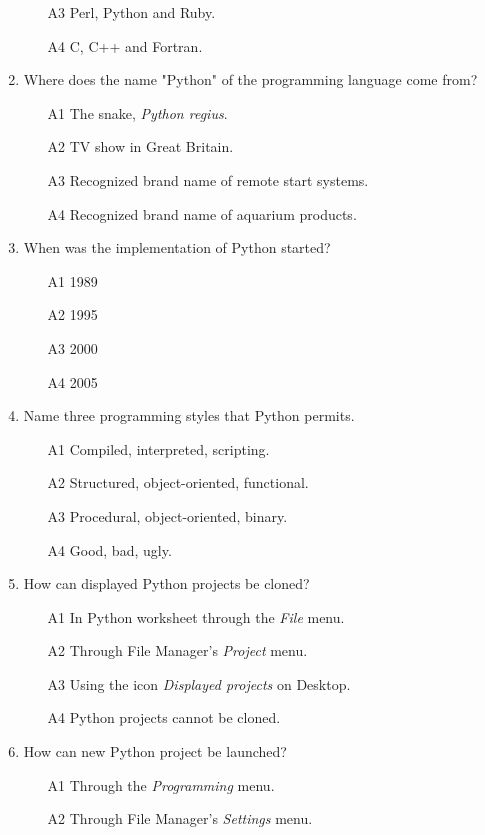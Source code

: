 \begin{enumerate}
\begin{enumerate}
\item[A3] Perl, Python and Ruby. 
\item[A4] C, C++ and Fortran.
\end{enumerate}
\item Where does the name "Python" of the programming language come from?
\begin{enumerate}
\item[A1] The snake, {\em Python regius}.
\item[A2] TV show in Great Britain.
\item[A3] Recognized brand name of remote start systems.
\item[A4] Recognized brand name of aquarium products.
\end{enumerate}
\item When was the implementation of Python started?
\begin{enumerate}
\item[A1] 1989
\item[A2] 1995
\item[A3] 2000
\item[A4] 2005
\end{enumerate}
\item Name three programming styles that Python permits.
\begin{enumerate}
\item[A1] Compiled, interpreted, scripting.
\item[A2] Structured, object-oriented, functional.
\item[A3] Procedural, object-oriented, binary.
\item[A4] Good, bad, ugly.
\end{enumerate}
\item How can displayed Python projects be cloned?
\begin{enumerate}
\item[A1] In Python worksheet through the {\em File} menu.
\item[A2] Through File Manager's {\em Project} menu.
\item[A3] Using the icon {\em Displayed projects} on Desktop.
\item[A4] Python projects cannot be cloned.
\end{enumerate}
\item How can new Python project be launched?
\begin{enumerate}
\item[A1] Through the {\em Programming} menu.
\item[A2] Through File Manager's {\em Settings} menu.

\end{enumerate}
\end{enumerate}
